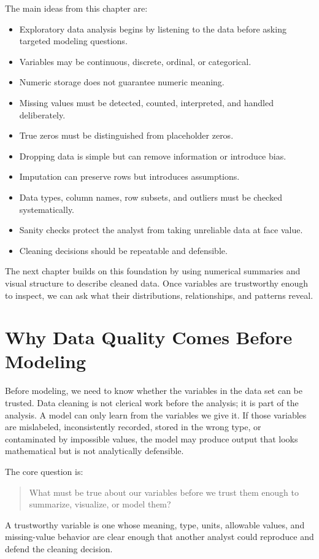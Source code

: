 {The main ideas from this chapter are:
\begin{itemize}
  \item Exploratory data analysis begins by listening to the data before asking targeted modeling questions.
  \item Variables may be continuous, discrete, ordinal, or categorical.
  \item Numeric storage does not guarantee numeric meaning.
  \item Missing values must be detected, counted, interpreted, and handled deliberately.
  \item True zeros must be distinguished from placeholder zeros.
  \item Dropping data is simple but can remove information or introduce bias.
  \item Imputation can preserve rows but introduces assumptions.
  \item Data types, column names, row subsets, and outliers must be checked systematically.
  \item Sanity checks protect the analyst from taking unreliable data at face value.
  \item Cleaning decisions should be repeatable and defensible.
\end{itemize}

The next chapter builds on this foundation by using numerical summaries and visual structure to describe cleaned data.  Once variables are trustworthy enough to inspect, we can ask what their distributions, relationships, and patterns reveal.
}{
\section{Why Data Quality Comes Before Modeling}

Before modeling, we need to know whether the variables in the data set can be trusted.  Data cleaning is not clerical work before the analysis; it is part of the analysis.  A model can only learn from the variables we give it.  If those variables are mislabeled, inconsistently recorded, stored in the wrong type, or contaminated by impossible values, the model may produce output that looks mathematical but is not analytically defensible.

The core question is:
\begin{quote}
  What must be true about our variables before we trust them enough to summarize, visualize, or model them?
\end{quote}
A trustworthy variable is one whose meaning, type, units, allowable values, and missing-value behavior are clear enough that another analyst could reproduce and defend the cleaning decision.

}
